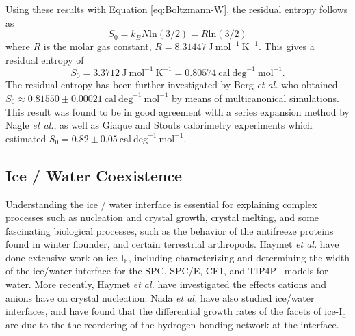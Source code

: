 Using these results with Equation \eqref{eq:Boltzmann-W}, the residual
entropy follows as
\begin{equation}
S_{0} = k_{B}N\mathrm{ln}(3/2) = R\mathrm{ln}(3/2)
\end{equation}
where $R$ is the molar gas constant,
$R = 8.31447~\mathrm{J~mol}^{-1}~\mathrm{K}^{-1}$. This gives a
residual entropy of
\begin{equation}
  S_{0} = 3.3712~\mathrm{J~mol}^{-1}~\mathrm{K}^{-1} = 0.80574~\mathrm{cal~deg}^{-1}~ \mathrm{mol}^{-1}.
\end{equation}
The residual entropy has been further investigated by Berg \textit{et
  al.} who obtained
$S_{0} \approx 0.81550 \pm 0.00021~\mathrm{cal~deg}^{-1}
~\mathrm{mol}^{-1}$ by means of multicanonical
simulations.\cite{Berg2007} This result was found to be in good
agreement with a series expansion method by Nagle \textit{et
  al.}\cite{Nagle1966}, as well as Giaque and Stouts calorimetry
experiments which estimated
$S_{0} = 0.82 \pm 0.05~\mathrm{cal~deg}^{-1}
~\mathrm{mol}^{-1}$.\cite{Giaque1936}


\subsection{Ice / Water Coexistence}
%

Understanding the ice / water interface is essential for explaining
complex processes such as nucleation and crystal
growth,\cite{Han1992,Granasy1995,Vanfleet1995} crystal
melting,\cite{Weber1983,Han1992,Sakai1996,Sakai1996a} and some
fascinating biological processes, such as the behavior of the
antifreeze proteins found in winter
flounder,\cite{Chapsky1997,Wierzbicki2007} and certain terrestrial
arthropods.\cite{Duman2001} Haymet \textit{et al.}  have done extensive
work on ice-I$_\mathrm{h}$, including characterizing and determining
the width of the ice/water interface for the SPC,\cite{Karim1990}
SPC/E,\cite{Gay2002,Bryk2002} CF1,\cite{Hayward2001,Hayward2002} and
TIP4P~\cite{Karim1988} models for water.  More recently, Haymet
\emph{et al.} have investigated the effects cations and anions have on
crystal nucleation.\cite{Bryk2004,Smith2005,Wilson2008,Wilson2010}
Nada \textit{et al.}  have also studied ice/water
interfaces,\cite{Nada1995,Nada2000,Nada2003a,Nada2012} and have found
that the differential growth rates of the facets of ice-I$_\mathrm{h}$
are due to the the reordering of the hydrogen bonding network at the
interface.\cite{Nada2005}


